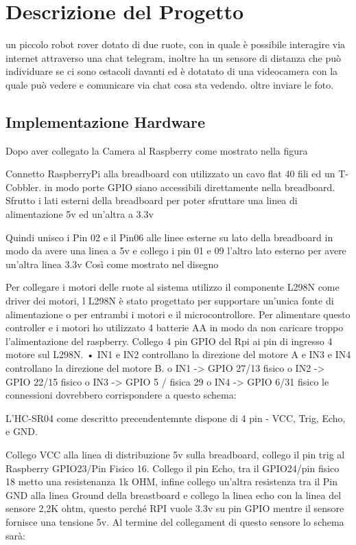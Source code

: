 \chapter{Descrizione del Progetto}
un piccolo robot rover dotato di due ruote, con in quale è possibile interagire via internet attraverso una chat telegram,  inoltre ha un sensore di distanza che può individuare se ci sono ostacoli davanti  ed è dotatato di una videocamera con la quale può vedere e comunicare via chat cosa sta vedendo. oltre inviare le foto.
\ifpdf
    \graphicspath{{Chapter3/Figs/Raster/}{Chapter3/Figs/PDF/}{Chapter3/Figs/}}
\else
    \graphicspath{{Chapter3/Figs/Vector/}{Chapter3/Figs/}}
\fi
\section{Implementazione Hardware}
Dopo aver collegato la Camera al Raspberry come mostrato nella figura

Connetto RaspberryPi alla breadboard con utilizzato un cavo flat 40 fili ed un T-Cobbler. 
in modo   porte GPIO siano accessibili direttamente nella breadboard. Sfrutto i lati esterni della breadboard per poter sfruttare una linea di alimentazione 5v ed un'altra a 3.3v

Quindi unisco i Pin 02 e il Pin06 alle linee esterne su lato della breadboard in modo da avere una linea a 5v e collego i pin 01 e 09 l’altro lato esterno per avere un’altra linea 3.3v
Così come mostrato nel disegno

Per collegare i motori delle ruote al sistema utilizzo il componente L298N come driver dei motori, l L298N è stato progettato per supportare un’unica fonte di alimentazione o per entrambi i motori e il microcontrollore. Per alimentare questo controller e i motori ho utilizzato 4 batterie AA in modo da non caricare troppo l’alimentazione del raspberry.
Collego  4 pin GPIO del Rpi ai pin di ingresso 4 motore sul L298N. 
•	IN1 e IN2 controllano la direzione del motore A e IN3 e IN4 controllano la direzione del motore B. 
o	IN1 -> GPIO 27/13 fisico
o	IN2 -> GPIO 22/15 fisico
o	IN3 -> GPIO 5 / fisica 29
o	IN4 -> GPIO 6/31 fisico
le connessioni dovrebbero corrispondere a questo schema:

L'HC-SR04 come descritto precendentemnte dispone di 4 pin - VCC, Trig, Echo, e GND.

Collego VCC alla linea di distribuzione 5v sulla breadboard, collego il pin trig al Raspberry GPIO23/Pin Fisico 16. Collego il pin Echo, tra il GPIO24/pin fisico 18 metto una resistenanza 1k OHM, infine collego un’altra resistenza tra il Pin GND alla linea Ground della breastboard e collego la linea echo con la linea del sensore 2,2K ohtm, questo perché RPI vuole 3.3v su pin GPIO  mentre il sensore fornisce una tensione 5v.
Al termine del collegament di questo sensore lo schema sarà:

